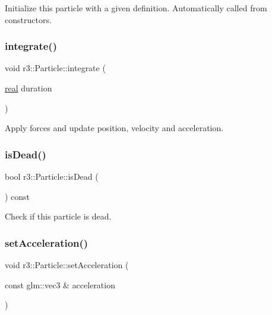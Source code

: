 Initialize this particle with a given definition. Automatically called from constructors. \mbox{\label{classr3_1_1_particle_aff134984d9bc7409579e16eca3e42b68}} 
\subsubsection{\texorpdfstring{integrate()}{integrate()}}
{\footnotesize\ttfamily void r3\+::\+Particle\+::integrate (\begin{DoxyParamCaption}\item[{\mbox{\hyperlink{namespacer3_ab2016b3e3f743fb735afce242f0dc1eb}{real}}}]{duration }\end{DoxyParamCaption})\hspace{0.3cm}{\ttfamily [virtual]}}

Apply forces and update position, velocity and acceleration. \mbox{\label{classr3_1_1_particle_aeeb9dd636d0851bc007ff718ef9140e9}} 
\subsubsection{\texorpdfstring{is\+Dead()}{isDead()}}
{\footnotesize\ttfamily bool r3\+::\+Particle\+::is\+Dead (\begin{DoxyParamCaption}{ }\end{DoxyParamCaption}) const}

Check if this particle is dead. \mbox{\label{classr3_1_1_particle_ad4c180ad74ee8cfd1b0e5c76347d6182}} 
\subsubsection{\texorpdfstring{set\+Acceleration()}{setAcceleration()}\hspace{0.1cm}{\footnotesize\ttfamily [1/2]}}
{\footnotesize\ttfamily void r3\+::\+Particle\+::set\+Acceleration (\begin{DoxyParamCaption}\item[{const glm\+::vec3 \&}]{acceleration }\end{DoxyParamCaption})}

